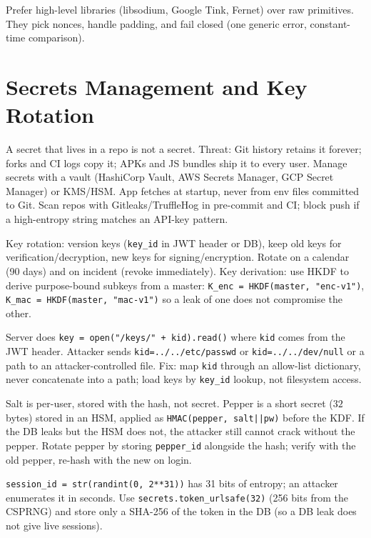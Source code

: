 Prefer high-level libraries (libsodium, Google Tink, Fernet) over raw primitives. They pick nonces, handle padding, and fail closed (one generic error, constant-time comparison).

\section{Secrets Management and Key Rotation}
\label{sec:secrets-mgmt}
A secret that lives in a repo is not a secret. Threat: Git history retains it forever; forks and CI logs copy it; APKs and JS bundles ship it to every user. Manage secrets with a vault (HashiCorp Vault, AWS Secrets Manager, GCP Secret Manager) or KMS/HSM. App fetches at startup, never from env files committed to Git. Scan repos with Gitleaks/TruffleHog in pre-commit and CI; block push if a high-entropy string matches an API-key pattern.

Key rotation: version keys (\texttt{key\_id} in JWT header or DB), keep old keys for verification/decryption, new keys for signing/encryption. Rotate on a calendar (90 days) and on incident (revoke immediately). Key derivation: use HKDF to derive purpose-bound subkeys from a master: \texttt{K\_enc = HKDF(master, "enc-v1")}, \texttt{K\_mac = HKDF(master, "mac-v1")} so a leak of one does not compromise the other.

\begin{example}
Server does \texttt{key = open("/keys/" + kid).read()} where \texttt{kid} comes from the JWT header. Attacker sends \texttt{kid=../../etc/passwd} or \texttt{kid=../../dev/null} or a path to an attacker-controlled file. Fix: map \texttt{kid} through an allow-list dictionary, never concatenate into a path; load keys by \texttt{key\_id} lookup, not filesystem access.
\end{example}

\begin{remark}
Salt is per-user, stored with the hash, not secret. Pepper is a short secret ($32$ bytes) stored in an HSM, applied as \texttt{HMAC(pepper, salt||pw)} before the KDF. If the DB leaks but the HSM does not, the attacker still cannot crack without the pepper. Rotate pepper by storing \texttt{pepper\_id} alongside the hash; verify with the old pepper, re-hash with the new on login.
\end{remark}

\begin{example}
\texttt{session\_id = str(randint(0, 2**31))} has 31 bits of entropy; an attacker enumerates it in seconds. Use \texttt{secrets.token\_urlsafe(32)} (256 bits from the CSPRNG) and store only a SHA-256 of the token in the DB (so a DB leak does not give live sessions).
\end{example}

